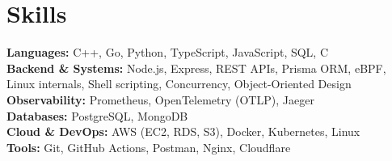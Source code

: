 \documentclass[11pt]{article}
\begin{document}
\section*{Skills}

\textbf{Languages:} C++, Go, Python, TypeScript, JavaScript, SQL, C \\

\textbf{Backend \& Systems:} Node.js, Express, REST APIs, Prisma ORM, eBPF, Linux internals, Shell scripting, Concurrency, Object-Oriented Design \\

\textbf{Observability:} Prometheus, OpenTelemetry (OTLP), Jaeger \\

\textbf{Databases:} PostgreSQL, MongoDB \\

\textbf{Cloud \& DevOps:} AWS (EC2, RDS, S3), Docker, Kubernetes, Linux \\

\textbf{Tools:} Git, GitHub Actions, Postman, Nginx, Cloudflare
\end{document}
